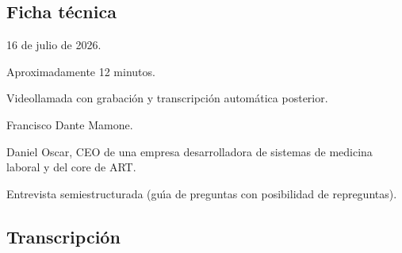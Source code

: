 \label{anexo:entrevista-daniel-oscar}

\subsection*{Ficha t\'ecnica}

\begin{description}[style=nextline, leftmargin=3.2cm, labelwidth=2.8cm]
	\item[Fecha] 16 de julio de 2026.
	\item[Duraci\'on] Aproximadamente 12 minutos.
	\item[Modalidad] Videollamada con grabaci\'on y transcripci\'on autom\'atica posterior.
	\item[Entrevistador] Francisco Dante Mamone.
	\item[Entrevistado] Daniel Oscar, CEO de una empresa desarrolladora de sistemas de medicina laboral y del core de ART.
	\item[Tipo] Entrevista semiestructurada (gu\'{\i}a de preguntas con posibilidad de repreguntas).
\end{description}

\subsection*{Transcripci\'on}

